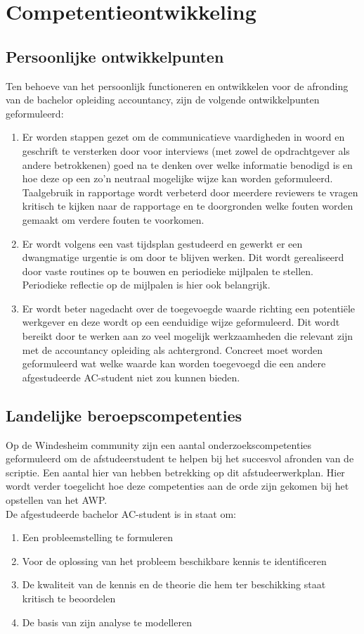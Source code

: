 \documentclass[10pt,a4paper,oneside]{report}
\begin{document}
\chapter{Competentieontwikkeling}
\section{Persoonlijke ontwikkelpunten}
Ten behoeve van het persoonlijk functioneren en ontwikkelen voor de afronding van de bachelor opleiding accountancy, zijn de volgende ontwikkelpunten geformuleerd:
\begin{enumerate}
    \item Er worden stappen gezet om de communicatieve vaardigheden in woord en geschrift te versterken door voor interviews (met zowel de opdrachtgever als andere betrokkenen) goed na te denken over welke informatie benodigd is en hoe deze op een zo'n neutraal mogelijke wijze kan worden geformuleerd. Taalgebruik in rapportage wordt verbeterd door meerdere reviewers te vragen kritisch te kijken naar de rapportage en te doorgronden welke fouten worden gemaakt om verdere fouten te voorkomen. 
    \item Er wordt volgens een vast tijdsplan gestudeerd en gewerkt er een dwangmatige urgentie is om door te blijven werken. Dit wordt gerealiseerd door vaste routines op te bouwen en periodieke mijlpalen te stellen. Periodieke reflectie op de mijlpalen is hier ook belangrijk.
    \item Er wordt beter nagedacht over de toegevoegde waarde richting een potentiële werkgever en deze wordt op een eenduidige wijze geformuleerd. Dit wordt bereikt door te werken aan zo veel mogelijk werkzaamheden die relevant zijn met de accountancy opleiding als achtergrond. Concreet moet worden geformuleerd wat welke waarde kan worden toegevoegd die een andere afgestudeerde AC-student niet zou kunnen bieden.
\end{enumerate}

\newpage
\section{Landelijke beroepscompetenties}
Op de Windesheim community zijn een aantal onderzoekscompetenties geformuleerd om de afstudeerstudent te helpen bij het succesvol afronden van de scriptie. Een aantal hier van hebben betrekking op dit afstudeerwerkplan. Hier wordt verder toegelicht hoe deze competenties aan de orde zijn gekomen bij het opstellen van het AWP. \\
De afgestudeerde bachelor AC-student is in staat om: 
\begin{enumerate}
    \item Een probleemstelling te formuleren
    \item Voor de oplossing van het probleem beschikbare kennis te identificeren
    \item De kwaliteit van de kennis en de theorie die hem ter beschikking staat kritisch te beoordelen
    \item De basis van zijn analyse te modelleren
\end{enumerate}
\end{document}
